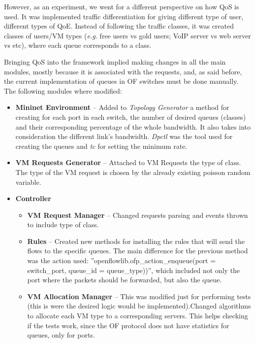 \documentclass[12pt,english,oneside]{book}
\begin{document}
However, as an experiment, we went for a different perspective on how QoS is used.
It was implemented traffic differentiation for giving different type of user, different types of QoE.
Instead of following the traffic classes, it was created classes of users/VM types (\textit{e.g.} free users vs gold users; VoIP server vs web server vs etc), where each queue corresponds to a class.

Bringing QoS into the framework implied making changes in all the main modules, mostly because it is associated with the requests, and, as said before, the current implementation of queues in OF switches must be done manually.
The following modules where modified:
\begin{itemize}
  \item \textbf{Mininet Environment} -- Added to \textit{Topology Generator} a method for creating for each port in each switch, the number of desired queues (classes) and their corresponding percentage of the whole bandwidth. It also takes into consideration the different link's bandwidth. \textit{Dpctl} was the tool used for creating the queues and \textit{tc} for setting the minimum rate.

  \item \textbf{VM Requests Generator} -- Attached to VM Requests the type of class. The type of the VM request is chosen by the already existing poisson random variable.

  \item \textbf{Controller}
  \begin{itemize}
    \item \textbf{VM Request Manager} -- Changed requests parsing and events thrown to include type of class.
    \item \textbf{Rules} -- Created new methods for installing the rules that will send the flows to the specific queues. The main difference for the previous method was the action used: ''openflowlib.ofp\_action\_enqueue(port = switch\_port, queue\_id = queue\_type))'', which included not only the port where the packets should be forwarded, but also the queue.

    \item \textbf{VM Allocation Manager} -- This was modified just for performing tests (this is were the desired logic would be implemented).Changed algorithms to allocate each VM type to a corresponding servers. This helps checking if the tests work, since the OF protocol does not have statistics for queues, only for ports.
  \end{itemize}
\end{itemize}
\end{document}

